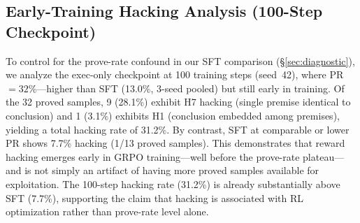 \begin{table}[h]
\centering
\caption{Per-seed results at $\beta{=}0.3$ (FOL). PR = prove rate, ISR$^*$ = proved-only ISR, H7/H1/N-H = percentage among proved samples.}
\label{tab:beta03-detailed}
\small
{}
\end{table}

\subsection{Early-Training Hacking Analysis (100-Step Checkpoint)}
\label{app:100step}

To control for the prove-rate confound in our SFT comparison (\S\ref{sec:diagnostic}), we analyze the exec-only checkpoint at 100 training steps (seed~42), where PR${=}32$\%---higher than SFT (13.0\%, 3-seed pooled) but still early in training.
Of the 32 proved samples, 9 (28.1\%) exhibit H7 hacking (single premise identical to conclusion) and 1 (3.1\%) exhibits H1 (conclusion embedded among premises), yielding a total hacking rate of 31.2\%.
By contrast, SFT at comparable or lower PR shows 7.7\% hacking (1/13 proved samples).
This demonstrates that reward hacking emerges early in GRPO training---well before the prove-rate plateau---and is not simply an artifact of having more proved samples available for exploitation.
The 100-step hacking rate (31.2\%) is already substantially above SFT (7.7\%), supporting the claim that hacking is associated with RL optimization rather than prove-rate level alone.

